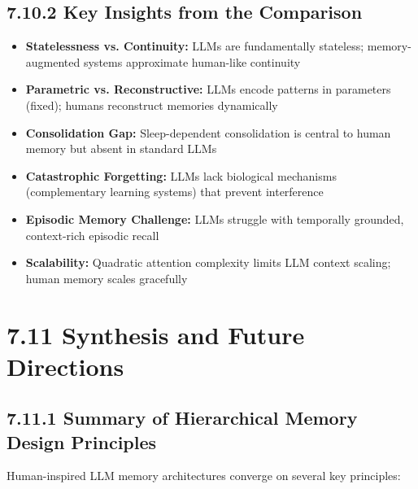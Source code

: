 \documentclass[11pt,letterpaper]{article}
\begin{document}
\subsection{7.10.2 Key Insights from the Comparison}

\begin{itemize}[leftmargin=*]
    \item \textbf{Statelessness vs. Continuity:} LLMs are fundamentally stateless; memory-augmented systems approximate human-like continuity
    \item \textbf{Parametric vs. Reconstructive:} LLMs encode patterns in parameters (fixed); humans reconstruct memories dynamically
    \item \textbf{Consolidation Gap:} Sleep-dependent consolidation is central to human memory but absent in standard LLMs
    \item \textbf{Catastrophic Forgetting:} LLMs lack biological mechanisms (complementary learning systems) that prevent interference
    \item \textbf{Episodic Memory Challenge:} LLMs struggle with temporally grounded, context-rich episodic recall
    \item \textbf{Scalability:} Quadratic attention complexity limits LLM context scaling; human memory scales gracefully
\end{itemize}

\section{\color{garnet}7.11 Synthesis and Future Directions}

\subsection{7.11.1 Summary of Hierarchical Memory Design Principles}

Human-inspired LLM memory architectures converge on several key principles:
\end{document}
